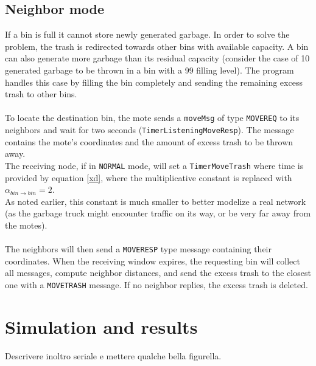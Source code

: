 \documentclass[a4paper,10pt]{article}
\begin{document}
\subsection{Neighbor mode}
If a bin is full it cannot store newly generated garbage. In order to solve the problem, the trash is redirected towards other bins with available capacity. A bin can also generate more garbage than its residual capacity (consider the case of 10 generated garbage to be thrown in a bin with a 99 filling level). The program handles this case by filling the bin completely and sending the remaining excess trash to other bins. \\ \\
To locate the destination bin, the mote sends a \texttt{moveMsg} of type \texttt{MOVEREQ} to its neighbors and wait for two seconds (\texttt{TimerListeningMoveResp}). The message contains the mote's coordinates and the amount of excess trash to be thrown away. \\The receiving node, if in \texttt{NORMAL} mode, will set a \texttt{TimerMoveTrash} where time is provided by equation \eqref{xd}, where the multiplicative constant is replaced with $\displaystyle \alpha_{bin\rightarrow bin} = 2$. \\As noted earlier, this constant is much smaller to better modelize a real network (as the garbage truck might encounter traffic on its way, or be very far away from the motes).\\\\
The neighbors will then send a \texttt{MOVERESP} type message containing their coordinates. When the receiving window expires, the requesting bin will collect all messages, compute neighbor distances, and send the excess trash to the closest one with a \texttt{MOVETRASH} message. If no neighbor replies, the excess trash is deleted.
\section{Simulation and results}
Descrivere inoltro seriale e mettere qualche bella figurella.
\end{document}
